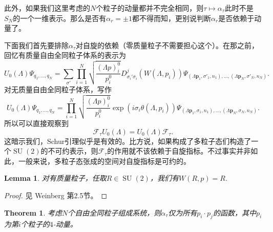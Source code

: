 \documentclass[11pt]{article}
\theoremstyle{definition}
\theoremstyle{plain}
\newtheorem{thm}[para]{Theorem}
\newtheorem{lem}[para]{Lemma}
\begin{document}
此外，如果我们这里考虑的$N$个粒子的动量都并不完全相同，则$\tau \mapsto \alpha_\tau$此时不是$S_N$的一个一维表示。那么是否有$\alpha_r=\pm 1$都不得而知，更别说判断$\alpha_r$是否依赖于动量了。

下面我们首先要排除$\alpha_\tau$对自旋的依赖（零质量粒子不需要担心这个）。在那之前，回忆有质量自由全同粒子体系的表示为
\[
	U_0(\Lambda)\Psi_{q_1,\dots,q_N}=\sum_{\sigma'}\prod_{i=1}^N \sqrt{\frac{(\Lambda p)^0_i}{p^0_i}}D^{j}_{\sigma_i'\sigma_i}(W(\Lambda,p_i))\Psi_{(\Lambda \bm{p}_1,\sigma'_1,n_1),\dots,(\Lambda \bm{p}_N,\sigma'_N,n_N)}.
\]
对无质量自由全同粒子体系，写作
\[
	U_0(\Lambda)\Psi_{q_1,\dots,q_N}=\prod_{i=1}^N \sqrt{\frac{(\Lambda p)^0_i}{p^0_i}}\exp(i\sigma_i \theta(\Lambda,p_i))\Psi_{(\Lambda \bm{p}_1,\sigma_1,n_1),\dots,(\Lambda \bm{p}_N,\sigma_N,n_N)}.
\]
所以可以直接观察到
\[
	\mathscr{F}_{\tau}U_0(\Lambda)=U_0(\Lambda)\mathscr{F}_{\tau}.
\]
这暗示我们，Schur引理似乎是有效的。比方说，如果构成了多粒子态们构造了一个$\operatorname{SU}(2)$的不可约表示，则$\mathscr{F}_{\tau}$的作用就不该依赖于自旋指标。不过事实并非如此，一般来说，多粒子态张成的空间对自旋指标是可约的。

\begin{lem}\label{lem:2.2}
对有质量粒子，任取$R\in \operatorname{SU}(2)$，我们有$W(R,p)=R$. 
\end{lem}

\begin{proof}
见 Weinberg 第2.5节。
\end{proof}

\begin{thm}
考虑$N$个自由全同粒子组成系统，则$\alpha_\tau$仅为所有$p_i\cdot p_j$的函数，其中$p_i$为第$i$个粒子的$4$-动量。
\end{thm}
\end{document}
